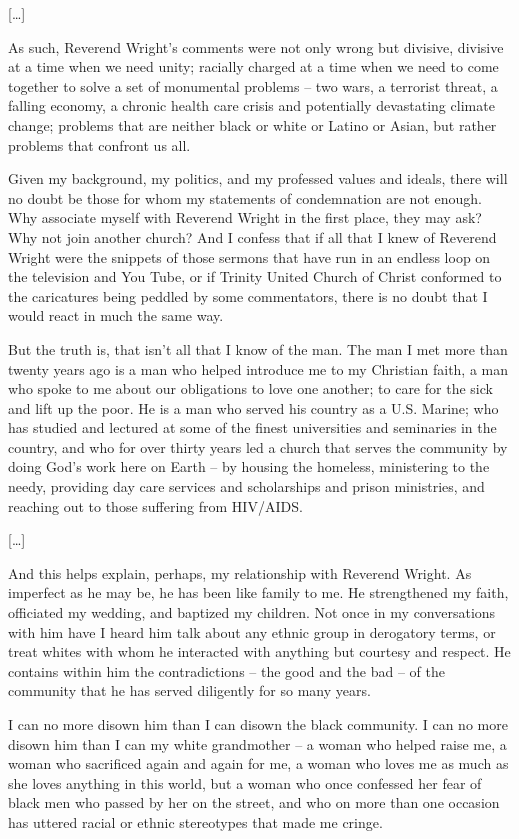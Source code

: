 \documentclass[10pt,a4paper]{article}
\begin{document}
[…]

As such, Reverend Wright’s comments were not only wrong but divisive, divisive at a time when we need unity; racially charged at a time when we need to come together to solve a set of monumental problems – two wars, a terrorist threat, a falling economy, a chronic health care crisis and potentially devastating climate change; problems that are neither black or white or Latino or Asian, but rather problems that confront us all.

Given my background, my politics, and my professed values and ideals, there will no doubt be those for whom my statements of condemnation are not enough. Why associate myself with Reverend Wright in the first place, they may ask? Why not join another church? And I confess that if all that I knew of Reverend Wright were the snippets of those sermons that have run in an endless loop on the television and You Tube, or if Trinity United Church of Christ conformed to the caricatures being peddled by some commentators, there is no doubt that I would react in much the same way.

But the truth is, that isn’t all that I know of the man. The man I met more than twenty years ago is a man who helped introduce me to my Christian faith, a man who spoke to me about our obligations to love one another; to care for the sick and lift up the poor. He is a man who served his country as a U.S. Marine; who has studied and lectured at some of the finest universities and seminaries in the country, and who for over thirty years led a church that serves the community by doing God’s work here on Earth – by housing the homeless, ministering to the needy, providing day care services and scholarships and prison ministries, and reaching out to those suffering from HIV/AIDS.

[…]

And this helps explain, perhaps, my relationship with Reverend Wright. As imperfect as he may be, he has been like family to me. He strengthened my faith, officiated my wedding, and baptized my children. Not once in my conversations with him have I heard him talk about any ethnic group in derogatory terms, or treat whites with whom he interacted with anything but courtesy and respect. He contains within him the contradictions – the good and the bad – of the community that he has served diligently for so many years.

I can no more disown him than I can disown the black community. I can no more disown him than I can my white grandmother – a woman who helped raise me, a woman who sacrificed again and again for me, a woman who loves me as much as she loves anything in this world, but a woman who once confessed her fear of black men who passed by her on the street, and who on more than one occasion has uttered racial or ethnic stereotypes that made me cringe.
\end{document}
